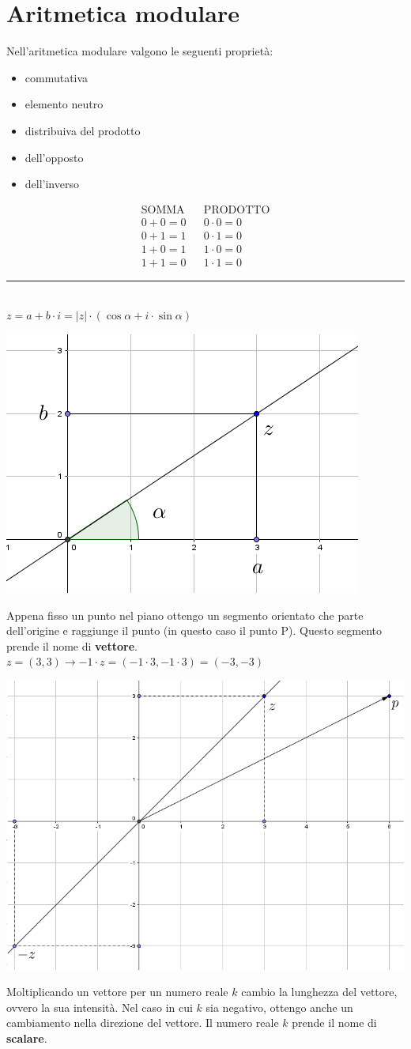\documentclass[italian]{article}
\begin{document}
\pagebreak
\section{Aritmetica modulare}
Nell'aritmetica modulare valgono le seguenti proprietà:
\begin{itemize}
	\item commutativa
	\item elemento neutro
	\item distribuiva del prodotto
	\item dell'opposto
	\item dell'inverso
\end{itemize}
\begin{align*}
	\text{SOMMA} && \text{PRODOTTO}\\
	0+0=0 && 0\cdot 0=0\\
	0+1=1 && 0\cdot 1=0\\
	1+0=1 && 1\cdot 0 = 0\\
	1+1=0 && 1\cdot 1=0
\end{align*}
\noindent\rule{8cm}{0.4pt} \\
$z = a + b\cdot i = |z|\cdot(\cos \alpha + i\cdot \sin \alpha)$
\begin{center}
	\includegraphics[width=0.3\linewidth]{img/vettori_0.png}	
\end{center}
Appena fisso un punto nel piano ottengo un segmento orientato che parte dell'origine e raggiunge il punto (in questo caso il punto P). Questo segmento prende il nome di \textbf{vettore}.\\
$z = (3,3) \to -1\cdot z = (-1\cdot 3, -1\cdot 3) = (-3,-3)$
\begin{center}
	\includegraphics[width=0.4\linewidth]{img/vettori_-1.png}	
\end{center}
Moltiplicando un vettore per un numero reale $k$ cambio la lunghezza del vettore, ovvero la sua intensità. Nel caso in cui $k$ sia negativo, ottengo anche un cambiamento nella direzione del vettore. Il numero reale $k$ prende il nome di \textbf{scalare}.
\end{document}

